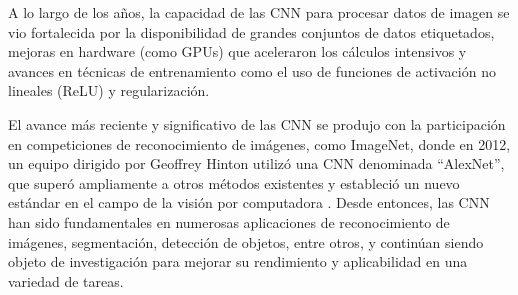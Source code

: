 A lo largo de los años, la capacidad de las CNN para procesar datos de imagen se vio fortalecida por la disponibilidad de grandes conjuntos de datos etiquetados, mejoras en hardware (como GPUs) que aceleraron los cálculos intensivos y avances en técnicas de entrenamiento como el uso de funciones de activación no lineales (ReLU) y regularización.

El avance más reciente y significativo de las CNN se produjo con la participación en competiciones de reconocimiento de imágenes, como ImageNet, donde en 2012, un equipo dirigido por Geoffrey Hinton utilizó una CNN denominada ``AlexNet'', que superó ampliamente a otros métodos existentes y estableció un nuevo estándar en el campo de la visión por computadora \cite{krizhevsky2012imagenet}. Desde entonces, las CNN han sido fundamentales en numerosas aplicaciones de reconocimiento de imágenes, segmentación, detección de objetos, entre otros, y continúan siendo objeto de investigación para mejorar su rendimiento y aplicabilidad en una variedad de tareas.
